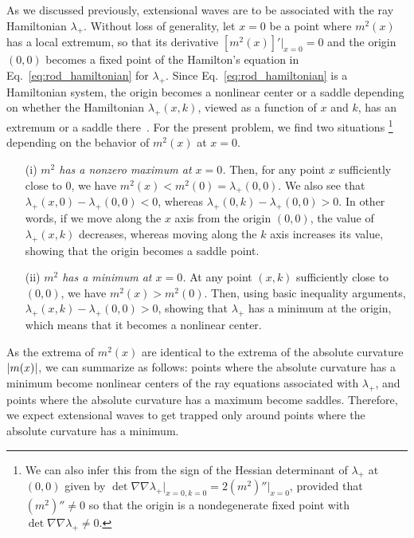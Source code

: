 As we discussed previously, extensional waves are to be associated with the ray Hamiltonian $\lambda_{+}$.
Without loss of generality, let $x = 0$ be a point where $m^{2}(x)$ has a local extremum, so that its derivative $[m^{2}(x)]'\big|_{x=0} = 0$ and the origin $(0, 0)$ becomes a fixed point of the Hamilton's equation in Eq.~\eqref{eq:rod_hamiltonian} for $\lambda_{+}$.
Since Eq.~\eqref{eq:rod_hamiltonian} is a Hamiltonian system, the origin becomes a nonlinear center or a saddle depending on whether the Hamiltonian $\lambda_{+}(x, k)$, viewed as a function of $x$ and $k$, has an extremum or a saddle there~\cite{strogatz1994,jordan2007}.
For the present problem, we find two situations%
\footnote{We can also infer this from the sign of the Hessian determinant of $\lambda_{+}$ at $(0, 0)$ given by $\det \nabla\nabla \lambda_{+}\big|_{x=0,k=0} = 2(m^{2})''\big|_{x=0}$, provided that $(m^{2})'' \neq 0$ so that the origin is a nondegenerate fixed point with $\det\nabla\nabla\lambda_{+} \neq 0$.}
depending on the behavior of $m^{2}(x)$ at $x = 0$.
%
\begin{enumerate}
    \item[(i)]
  \emph{$m^{2}$ has a nonzero maximum at $x = 0$.\enspace}
  Then, for any point $x$ sufficiently close to $0$, we have $m^{2}(x) < m^{2}(0) = \lambda_{+}(0, 0)$.
  We also see that $\lambda_{+}(x, 0) - \lambda_{+}(0, 0) < 0$, whereas $\lambda_{+}(0, k) - \lambda_{+}(0, 0) > 0$.
  In other words, if we move along the $x$ axis from the origin $(0, 0)$, the value of $\lambda_{+}(x, k)$ decreases, whereas moving along the $k$ axis increases its value, showing that the origin becomes a saddle point.

  \item[(ii)] \emph{$m^{2}$ has a minimum at $x = 0$.\enspace}
    At any point $(x, k)$ sufficiently close to $(0, 0)$, we have $m^{2}(x) > m^{2}(0)$.
    Then, using basic inequality arguments, $\lambda_{+}(x, k) - \lambda_{+}(0, 0) > 0$, showing that $\lambda_{+}$ has a minimum at the origin, which means that it becomes a nonlinear center.
\end{enumerate}
%
As the extrema of $m^{2}(x)$ are identical to the extrema of the absolute curvature $\lvert m(x)\rvert$, we can summarize as follows: points where the absolute curvature has a minimum become nonlinear centers of the ray equations associated with $\lambda_{+}$, and points where the absolute curvature has a maximum become saddles.
Therefore, we expect extensional waves to get trapped only around points where the absolute curvature has a minimum.
